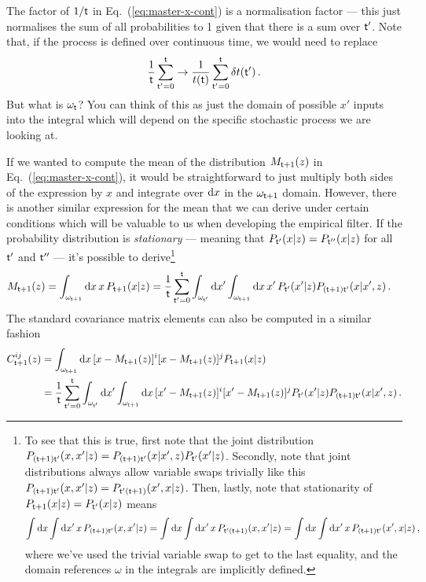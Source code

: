 The factor of $1/{\sf t}$ in Eq.~(\ref{eq:master-x-cont}) is a normalisation factor --- this just normalises the sum of all probabilities to 1 given that there is a sum over ${\sf t}'$. Note that, if the process is defined over continuous time, we would need to replace 
\begin{align}
\frac{1}{{\sf t}}\sum_{{\sf t}'=0}^{{\sf t}} \rightarrow \frac{1}{t({\sf t})}\sum_{{\sf t}'=0}^{{\sf t}}\delta t({\sf t}') \,.
\end{align}
But what is $\omega_{\sf t}$? You can think of this as just the domain of possible $x'$ inputs into the integral which will depend on the specific stochastic process we are looking at.

If we wanted to compute the mean of the distribution $M_{{\sf t}+1}(z)$ in Eq.~(\ref{eq:master-x-cont}), it would be straightforward to just multiply both sides of the expression by $x$ and integrate over ${\rm d}x$ in the $\omega_{{\sf t}+1}$ domain. However, there is another similar expression for the mean that we can derive under certain conditions which will be valuable to us when developing the empirical filter. If the probability distribution is \emph{stationary} --- meaning that $P_{{\sf t}'}(x\vert z)=P_{{\sf t}''}(x\vert z)$ for all ${\sf t}'$ and ${\sf t}''$ --- it's possible to derive\footnote{To see that this is true, first note that the joint distribution $P_{({\sf t}+1){\sf t}'}(x,x'\vert z)=P_{({\sf t}+1){\sf t}'}(x\vert x',z)P_{{\sf t}'}(x'\vert z)$. Secondly, note that joint distributions always allow variable swaps trivially like this $P_{({\sf t}+1){\sf t}'}(x,x'\vert z)=P_{{\sf t}'({\sf t}+1)}(x',x\vert z)$. Then, lastly, note that stationarity of $P_{{\sf t}+1}(x\vert z)=P_{{\sf t}'}(x\vert z)$ means 
$$\int {\rm d}x\int {\rm d}x' \, x\,P_{({\sf t}+1){\sf t}'}(x,x'\vert z)=\int {\rm d}x\int {\rm d}x'  \, x\, P_{{\sf t}'({\sf t}+1)}(x,x'\vert z)=\int {\rm d}x\int {\rm d}x'  \, x\, P_{({\sf t}+1){\sf t}'}(x',x\vert z)\,,$$
where we've used the trivial variable swap to get to the last equality, and the domain references $\omega$ in the integrals are implicitly defined.} 
\begin{align}
M_{{\sf t}+1}(z) = \int_{\omega_{{\sf t}+1}}{\rm d}x \,x\,P_{{\sf t}+1}(x\vert z) &= \frac{1}{{\sf t}}\sum_{{\sf t}'=0}^{{\sf t}}\int_{\omega_{{\sf t}'}}{\rm d}x'\int_{\omega_{{\sf t}+1}}{\rm d}x \, x' \, P_{{\sf t}'}(x'\vert z) P_{({\sf t}+1){\sf t}'}(x\vert x',z) \label{eq:stationary-mean-estimator}\,.
\end{align}
The standard covariance matrix elements can also be computed in a similar fashion
\begin{align}
C^{ij}_{{\sf t}+1}(z) &= \int_{\omega_{{\sf t}+1}}{\rm d}x \,[x-M_{{\sf t}+1}(z)
]^i[x-M_{{\sf t}+1}(z)]^jP_{{\sf t}+1}(x\vert z) \nonumber \\
&= \frac{1}{{\sf t}}\sum_{{\sf t}'=0}^{{\sf t}}\int_{\omega_{{\sf t}'}}{\rm d}x'\int_{\omega_{{\sf t}+1}}{\rm d}x \, [x'-M_{{\sf t}+1}(z)]^i[x'-M_{{\sf t}+1}(z)]^j P_{{\sf t}'}(x'\vert z) P_{({\sf t}+1){\sf t}'}(x\vert x',z) \label{eq:stationary-covariance-estimator}\,.
\end{align}

